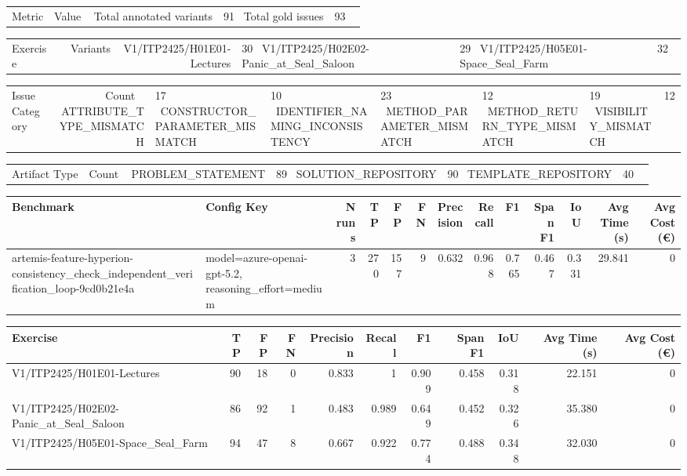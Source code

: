 \begin{tabular}{lr}
Metric & Value \
\hline
Total annotated variants & 91 \
Total gold issues & 93 \
\end{tabular}

\begin{tabular}{lr}
Exercise & Variants \
\hline
V1/ITP2425/H01E01-Lectures & 30 \
V1/ITP2425/H02E02-Panic\_at\_Seal\_Saloon & 29 \
V1/ITP2425/H05E01-Space\_Seal\_Farm & 32 \
\end{tabular}

\begin{tabular}{lr}
Issue Category & Count \
\hline
ATTRIBUTE\_TYPE\_MISMATCH & 17 \
CONSTRUCTOR\_PARAMETER\_MISMATCH & 10 \
IDENTIFIER\_NAMING\_INCONSISTENCY & 23 \
METHOD\_PARAMETER\_MISMATCH & 12 \
METHOD\_RETURN\_TYPE\_MISMATCH & 19 \
VISIBILITY\_MISMATCH & 12 \
\end{tabular}

\begin{tabular}{lr}
Artifact Type & Count \
\hline
PROBLEM\_STATEMENT & 89 \
SOLUTION\_REPOSITORY & 90 \
TEMPLATE\_REPOSITORY & 40 \
\end{tabular}

\begin{tabular}{llrrrrrrrrrrr}
Benchmark & Config Key & N runs & TP & FP & FN & Precision & Recall & F1 & Span F1 & IoU & Avg Time (s) & Avg Cost (€) \\
\hline
artemis-feature-hyperion-consistency\_check\_independent\_verification\_loop-9cd0b21e4a & model=azure-openai-gpt-5.2, reasoning\_effort=medium & 3 & 270 & 157 & 9 & 0.632 & 0.968 & 0.765 & 0.467 & 0.331 & 29.841 & 0 \\
\end{tabular}

\begin{tabular}{lrrrrrrrrrr}
Exercise & TP & FP & FN & Precision & Recall & F1 & Span F1 & IoU & Avg Time (s) & Avg Cost (€) \\
\hline
V1/ITP2425/H01E01-Lectures & 90 & 18 & 0 & 0.833 & 1 & 0.909 & 0.458 & 0.318 & 22.151 & 0 \\
V1/ITP2425/H02E02-Panic\_at\_Seal\_Saloon & 86 & 92 & 1 & 0.483 & 0.989 & 0.649 & 0.452 & 0.326 & 35.380 & 0 \\
V1/ITP2425/H05E01-Space\_Seal\_Farm & 94 & 47 & 8 & 0.667 & 0.922 & 0.774 & 0.488 & 0.348 & 32.030 & 0 \\
\end{tabular}
